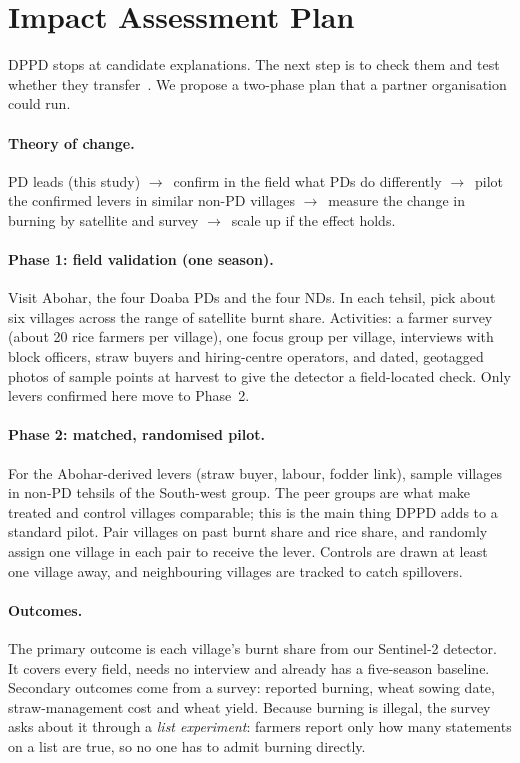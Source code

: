 \documentclass[sigconf,nonacm]{acmart}
\newcommand{\ra}{$\rightarrow$}
\begin{document}
\section{Impact Assessment Plan}
\label{sec:impact}

DPPD stops at candidate explanations. The next step is to check them and test whether they transfer~\cite{dppd2021handbook}. We propose a two-phase plan that a partner organisation could run.

\paragraph{Theory of change.} PD leads (this study) \ra\ confirm in the field what PDs do differently \ra\ pilot the confirmed levers in similar non-PD villages \ra\ measure the change in burning by satellite and survey \ra\ scale up if the effect holds.

\paragraph{Phase 1: field validation (one season).} Visit Abohar, the four Doaba PDs and the four NDs. In each tehsil, pick about six villages across the range of satellite burnt share. Activities: a farmer survey (about 20 rice farmers per village), one focus group per village, interviews with block officers, straw buyers and hiring-centre operators, and dated, geotagged photos of sample points at harvest to give the detector a field-located check. Only levers confirmed here move to Phase~2.

\paragraph{Phase 2: matched, randomised pilot.} For the Abohar-derived levers (straw buyer, labour, fodder link), sample villages in non-PD tehsils of the South-west group. The peer groups are what make treated and control villages comparable; this is the main thing DPPD adds to a standard pilot. Pair villages on past burnt share and rice share, and randomly assign one village in each pair to receive the lever. Controls are drawn at least one village away, and neighbouring villages are tracked to catch spillovers.

\paragraph{Outcomes.} The primary outcome is each village's burnt share from our Sentinel-2 detector. It covers every field, needs no interview and already has a five-season baseline. Secondary outcomes come from a survey: reported burning, wheat sowing date, straw-management cost and wheat yield. Because burning is illegal, the survey asks about it through a \emph{list experiment}: farmers report only how many statements on a list are true, so no one has to admit burning directly.
\end{document}
